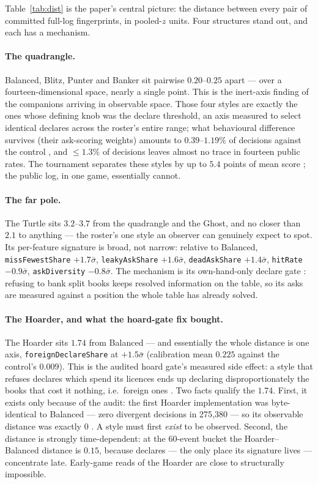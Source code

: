 \documentclass[11pt]{article}
\newcommand{\code}[1]{\texttt{#1}}
\begin{document}
Table~\ref{tab:dist} is the paper's central picture: the distance between every pair of
committed full-log fingerprints, in pooled-$z$ units. Four structures stand out, and each has
a mechanism.

\paragraph{The quadrangle.} Balanced, Blitz, Punter and Banker sit pairwise
$0.20$--$0.25$ apart --- over a fourteen-dimensional space, nearly a single point. This is
the inert-axis finding of the companions \cite{inertpaper,v05} arriving in observable space.
Those four styles are exactly the ones whose defining knob was the declare threshold, an axis
measured to select identical declares across the roster's entire range; what behavioural
difference survives (their ask-scoring weights) amounts to $0.39$--$1.19\%$ of decisions
against the control \cite{styles}, and $\le 1.3\%$ of decisions leaves almost no trace in
fourteen public rates. The tournament separates these styles by up to $5.4$ points of mean
score \cite{v05}; the public log, in one game, essentially cannot.

\paragraph{The far pole.} The Turtle sits $3.2$--$3.7$ from the quadrangle and the Ghost, and
no closer than $2.1$ to anything --- the roster's one style an observer can genuinely expect
to spot. Its per-feature signature is broad, not narrow: relative to Balanced,
\code{missFewestShare} $+1.7\bar\sigma$, \code{leakyAskShare} $+1.6\bar\sigma$,
\code{deadAskShare} $+1.4\bar\sigma$, \code{hitRate} $-0.9\bar\sigma$, \code{askDiversity}
$-0.8\bar\sigma$. The mechanism is its own-hand-only declare gate \cite{v05}: refusing to
bank split books keeps resolved information on the table, so its asks are measured against a
position the whole table has already solved.

\paragraph{The Hoarder, and what the hoard-gate fix bought.} The Hoarder sits $1.74$ from
Balanced --- and essentially the whole distance is one axis, \code{foreignDeclareShare} at
$+1.5\bar\sigma$ (calibration mean $0.225$ against the control's $0.009$). This is the
audited hoard gate's measured side effect: a style that refuses declares which spend its
licences ends up declaring disproportionately the books that cost it nothing, i.e.\ foreign
ones \cite{styles,v05}. Two facts qualify the $1.74$. First, it exists only because of the
audit: the first Hoarder implementation was byte-identical to Balanced --- zero divergent
decisions in 275{,}380 --- so its observable distance was exactly $0$ \cite{v05}. A style
must first \emph{exist} to be observed. Second, the distance is strongly time-dependent: at
the 60-event bucket the Hoarder--Balanced distance is $0.15$, because declares --- the only
place its signature lives --- concentrate late. Early-game reads of the Hoarder are close to
structurally impossible.
\end{document}
